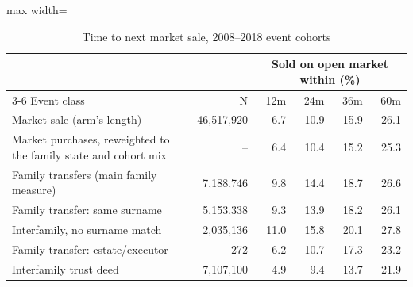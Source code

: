 \begin{table}[!t]\centering
\caption{Time to next market sale, 2008--2018 event cohorts}
\label{tab:hazard}
{\small
\begin{adjustbox}{max width=\textwidth}\begin{tabular}{lrrrrr}
\toprule
 & & \multicolumn{4}{c}{Sold on open market within (\%)} \\
\cmidrule(lr){3-6}
Event class & N & 12m & 24m & 36m & 60m \\
\midrule
Market sale (arm's length) & 46,517,920 & 6.7 & 10.9 & 15.9 & 26.1 \\
Market purchases, reweighted to the family state and cohort mix & -- & 6.4 & 10.4 & 15.2 & 25.3 \\
Family transfers (main family measure) & 7,188,746 & 9.8 & 14.4 & 18.7 & 26.6 \\
Family transfer: same surname & 5,153,338 & 9.3 & 13.9 & 18.2 & 26.1 \\
Interfamily, no surname match & 2,035,136 & 11.0 & 15.8 & 20.1 & 27.8 \\
Family transfer: estate/executor & 272 & 6.2 & 10.7 & 17.3 & 23.2 \\
Interfamily trust deed & 7,107,100 & 4.9 & 9.4 & 13.7 & 21.9 \\
\bottomrule
\end{tabular}\end{adjustbox}}
\begin{minipage}{0.9\textwidth}\end{minipage}
\end{table}
